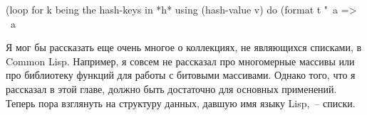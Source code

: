 \begin{myverb}  
  (loop for k being the hash-keys in *h* using (hash-value v)
    do (format t "~a => ~a~%
\end{myverb}

Я мог бы рассказать еще очень многое о коллекциях, не являющихся списками, в Common
Lisp.  Например, я совсем не рассказал про многомерные массивы или про библиотеку функций
для работы с битовыми массивами.  Однако того, что я рассказал в этой главе, должно быть
достаточно для основных применений.  Теперь пора взглянуть на
структуру данных, давшую имя языку Lisp,~-- списки.

